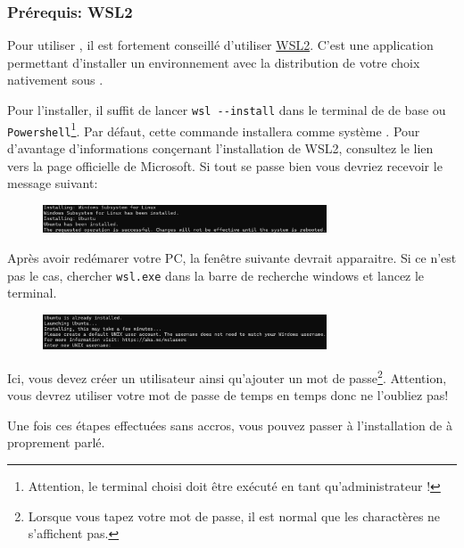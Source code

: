     \subsubsection[Prérequis][fr.wikipedia.org/wiki/Windows_Subsystem_for_Linux]{Prérequis: WSL2}

    Pour utiliser \dockerdesktop, il est fortement conseillé d'utiliser \href{https://learn.microsoft.com/fr-fr/windows/wsl/install}{WSL2}. C'est une application \windows{} permettant d'installer un environnement \linux{} avec la distribution de votre choix nativement sous \windows{}. 

    Pour l'installer, il suffit de lancer \verb|wsl --install| dans le terminal de \windows{} de base ou \texttt{Powershell}\footnote{Attention, le terminal choisi doit être exécuté en tant qu'administrateur !}. Par défaut, cette commande installera \ubuntu{} comme système \linux. Pour d'avantage d'informations conçernant l'installation de WSL2, consultez le lien vers la page officielle de Microsoft. Si tout se passe bien vous devriez recevoir le message suivant:

    \begin{figure}[!th]
        \centering
        \includegraphics[width=0.75\textwidth]{Images_formation/ubuntu_installation.pdf}
    \end{figure}

    Après avoir redémarer votre PC, la fenêtre suivante devrait apparaitre. Si ce n'est pas le cas, chercher \texttt{wsl.exe} dans la barre de recherche windows et lancez le terminal.

    \begin{figure}[!th]
        \centering
        \includegraphics[width=0.75\textwidth]{Images_formation/user_creation.pdf}
    \end{figure}

    Ici, vous devez créer un utilisateur ainsi qu'ajouter un mot de passe\footnote{Lorsque vous tapez votre mot de passe, il est normal que les charactères ne s'affichent pas.}. Attention, vous devrez utiliser votre mot de passe de temps en temps donc ne l'oubliez pas!

    Une fois ces étapes effectuées sans accros, vous pouvez passer à l'installation de \dockerdesktop à proprement parlé.

